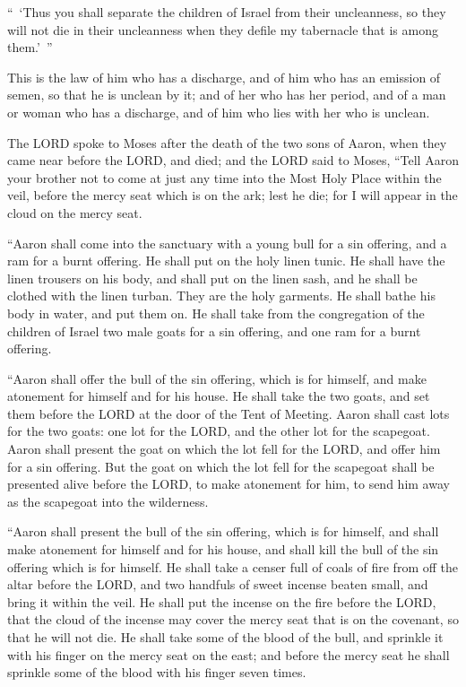 \myverse{}“ ‘Thus you shall separate the children of Israel from their
uncleanness, so they will not die in their uncleanness when they defile my tabernacle that is among them.’ ”


\myverse{}This is the law of him who has a discharge, and of him who has
an emission of semen, so that he is unclean by it;
\myverse{}and of her who has her period, and of a man or woman who has a discharge,
and of him who lies with her who is unclean.


\mychapter{} \myverse*{}The LORD spoke to Moses after the death of the two sons of Aaron,
when they came near before the LORD, and died;
\myverse{}and the LORD said to Moses, “Tell Aaron your brother not to come at just any
time into the Most Holy Place within the veil, before the mercy seat which is on the ark; lest he die;
for I will appear in the cloud on the mercy seat.


\myverse{}“Aaron shall come into the sanctuary with a young bull for a sin
offering, and a ram for a burnt offering.
\myverse{}He shall put on the holy linen tunic. He shall have the linen trousers on his
body, and shall put on the linen sash, and he shall be clothed with the linen turban. They are the holy
garments. He shall bathe his body in water, and put them on.
\myverse{}He shall take from the congregation of the children of Israel two male goats
for a sin offering, and one ram for a burnt offering.


\myverse{}“Aaron shall offer the bull of the sin offering, which is for
himself, and make atonement for himself and for his house.
\myverse{}He shall take the two goats, and set them before the LORD at the door of the
Tent of Meeting.
\myverse{}Aaron shall cast lots for the two goats: one lot for the LORD, and the other
lot for the scapegoat.
\myverse{}Aaron shall present the goat on which the lot fell for the LORD, and offer
him for a sin offering.
\myverse{}But the goat on which the lot fell for the scapegoat shall be presented alive
before the LORD, to make atonement for him, to send him away as the scapegoat into the wilderness.


\myverse{}“Aaron shall present the bull of the sin offering, which is
for himself, and shall make atonement for himself and for his house, and shall kill the bull of the sin
offering which is for himself.
\myverse{}He shall take a censer full of coals of fire from off the altar before the
LORD, and two handfuls of sweet incense beaten small, and bring it within the veil.
\myverse{}He shall put the incense on the fire before the LORD, that the cloud of the
incense may cover the mercy seat that is on the covenant, so that he will not die.
\myverse{}He shall take some of the blood of the bull, and sprinkle it with his finger
on the mercy seat on the east; and before the mercy seat he shall sprinkle some of the blood with his
finger seven times.


